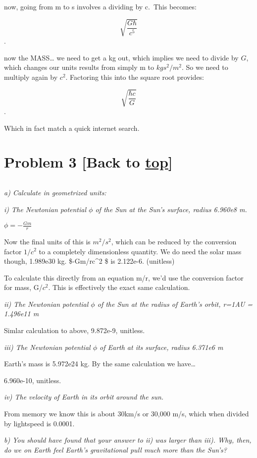 \documentclass[landscape,letterpaper,10pt,english]{article}
\begin{document}
now, going from m to s involves a dividing by c.~This becomes:

\[ \sqrt{\frac{G\hbar}{c^5}} \].

now the MASS\ldots{} we need to get a kg out, which implies we need to
divide by \(G\), which changes our units results from simply m to
\(kgs^2/m^2\). So we need to multiply again by \(c^2\). Factoring this
into the square root provides:

\[ \sqrt{\frac{\hbar c}{G}} \].

Which in fact match a quick internet search.

    \hypertarget{problem-3-back-to-top}{%
\section{\texorpdfstring{Problem 3 {[}Back to
\hyperref[toc]{top}{]}}{Problem 3 {[}Back to {]}}}\label{problem-3-back-to-top}}

\[\label{P3}\]

\emph{a) Calculate in geometrized units:}

\emph{i) The Newtonian potential \(\phi\) of the Sun at the Sun's
surface, radius 6.960e8 m.}

    \(\phi = -\frac{Gm}{r}\)

Now the final units of this is \(m^2/s^2\), which can be reduced by the
conversion factor \(1/c^2\) to a completely dimensionless quantity. We
do need the solar mass though, 1.989e30 kg. \$-Gm/rc\^{}2 \$ is
2.122e-6. (unitless)

To calculate this directly from an equation m/r, we'd use the conversion
factor for mass, G/\(c^2\). This is effectively the exact same
calculation.

    \emph{ii) The Newtonian potential \(\phi\) of the Sun at the radius of
Earth's orbit, r=1AU = 1.496e11 m}

    Simlar calculation to above, 9.872e-9, unitless.

    \emph{iii) The Newtonian potential \(\phi\) of Earth at its surface,
radius 6.371e6 m}

    Earth's mass is 5.972e24 kg. By the same calculation we have\ldots{}

6.960e-10, unitless.

    \emph{iv) The velocity of Earth in its orbit around the sun.}

From memory we know this is about 30km/s or 30,000 m/s, which when
divided by lightspeed is 0.0001.

    \emph{b) You should have found that your answer to ii) was larger than
iii). Why, then, do we on Earth feel Earth's gravitational pull much
more than the Sun's?}
\end{document}
